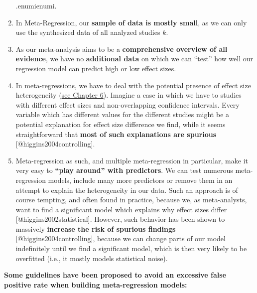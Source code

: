\documentclass[]{book}
\providecommand{\tightlist}{%
  \setlength{\itemsep}{0pt}\setlength{\parskip}{0pt}}
\begin{document}
\begin{rmdachtung}
\begin{enumerate}
\def\arabic{enumi}.{\arabic{enumi}.}
\tightlist
\item
  In Meta-Regression, our \textbf{sample of data is mostly small}, as we
  can only use the synthesized data of all analyzed studies \(k\).
\item
  As our meta-analysis aims to be a \textbf{comprehensive overview of
  all evidence}, we have no \textbf{additional data} on which we can
  ``test'' how well our regression model can predict high or low effect
  sizes.
\item
  In meta-regressions, we have to deal with the potential presence of
  effect size heterogeneity (\protect\hyperlink{heterogeneity}{see
  Chapter 6}). Imagine a case in which we have to studies with different
  effect sizes and non-overlapping confidence intervals. Every variable
  which has different values for the different studies might be a
  potential explanation for effect size difference we find, while it
  seems straightforward that \textbf{most of such explanations are
  spurious} {[}@higgins2004controlling{]}.
\item
  Meta-regression as such, and multiple meta-regression in particular,
  make it very easy to \textbf{``play around'' with predictors}. We can
  test numerous meta-regression models, include many more predictors or
  remove them in an attempt to explain the heterogeneity in our data.
  Such an approach is of course tempting, and often found in practice,
  because we, as meta-analysts, want to find a significant model which
  explains why effect sizes differ {[}@higgins2002statistical{]}.
  However, such behavior has been shown to massively \textbf{increase
  the risk of spurious findings} {[}@higgins2004controlling{]}, because
  we can change parts of our model indefinitely until we find a
  significant model, which is then very likely to be overfitted (i.e.,
  it mostly models statistical noise).
\end{enumerate}

\textbf{Some guidelines have been proposed to avoid an excessive false
positive rate when building meta-regression models:}


\end{rmdachtung}
\end{document}
